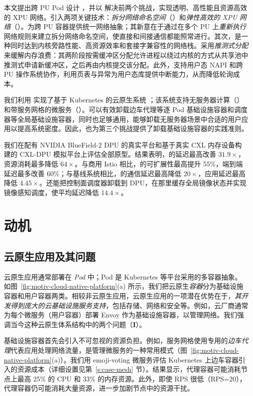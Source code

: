 本文提出跨 PU Pod 设计 \xpod，并以 \os 解决前两个挑战，实现透明、高性能且资源高效的 XPU 网络。\os 引入两项关键技术：\emph{拆分网络命名空间}（\giptable）和\emph{弹性高效的 XPU 网络}（\gsocket）。\giptable 为跨 PU 容器提供统一网络抽象；其新意在于通过在多个 PU 上\emph{重新执行}网络规则来建立拆分网络命名空间，使直接和间接通信都能照常进行。其次，\gsocket 是一种同时达到内核旁路性能、高资源效率和套接字兼容性的网络栈。\gsocket 采用\emph{推测式分配}来缓解内存浪费：其两阶段按需缓冲区分配允许进程以绕过内核的方式从共享池中推测式申请新缓冲区，之后再由内核提交该分配。此外，\gsocket 支持用户态 NAPI 和跨 PU 操作系统协作，利用页表与异常为用户态库提供中断能力，从而降低轮询成本。

我们利用 \xpod 实现了基于 Kubernetes 的云原生系统 \sys；该系统支持无服务器计算（\faas）和带服务网格的微服务（\mesh\cite{istio}）。\sys 可以有效卸载边车代理等逐 Pod 基础设施容器和调度器等全局基础设施容器，同时也足够通用，能够卸载无服务器场景中合适的用户应用以提高系统密度。因此，\sys 也为第三个挑战提供了卸载基础设施容器的实践准则。

我们在配有 NVIDIA BlueField-2 DPU 的真实平台和基于真实 CXL 内存设备构建的 CXL-DPU 模拟平台上评估全部原型。结果表明，\gsocket 的延迟最高改善 $31.9\times$，资源消耗最多降低 $64\times$。与商用 Istio 相比，\mesh 的可扩展性最高提升 55\%，端到端延迟最多改善 60\%；与基线系统相比，\faas 的通信延迟最高降低 $20\times$，应用延迟最高降低 $4.45\times$。\sys 还能把控制面调度器卸载到 DPU，在那里缓存全局镜像状态并实现镜像感知调度，使平均延迟降低 $14.4\times$。

\section{动机}
\label{s:challenge}

\subsection{云原生应用及其问题}

云原生应用通常部署在 \emph{Pod} 中；Pod 是 Kubernetes 等平台采用的多容器抽象。如图~\ref{fig:motiv-cloud-native-platform}(a) 所示，我们把云原生\emph{容器}分为基础设施容器和用户容器两类。相较非云原生应用，云原生应用的一项潜在优势在于，\emph{其开发得到庞大的云基础设施服务支持}，包括存储、网络和安全等。例如，云厂商通常为每个微服务（用户容器）部署 Envoy\cite{envoy} 作为基础设施容器，以管理网络。我们强调当今这种云原生体系结构中的两个问题（\textbf{I}）。

基础设施容器首先会引入不可忽视的资源负担。例如，服务网格\cite{service-mesh}使用专用的\emph{边车代理}代表应用处理网络流量，是管理微服务的一种常用模式（图~\ref{fig:motiv-cloud-native-platform}(a)）。我们用 emoji-voting\cite{emojivote} 微服务评估 Kubernetes 上边车容器引入的资源成本（详细设置见第~\ref{s:case-mesh} 节）。结果显示，代理容器可能消耗节点上最高 25\% 的 CPU 和 33\% 的内存资源。此外，即使 RPS 很低（RPS=20），代理容器仍可能消耗大量资源，进一步加剧节点中的资源干扰。

